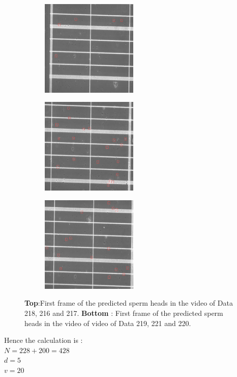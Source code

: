 \documentclass{article}
\begin{document}
\begin{figure}[H]
  \begin{subfigure}{4.6cm}
    \centering\includegraphics[width=4.6cm]{Data219_frame0_pred.jpg}
  \end{subfigure}
  \begin{subfigure}{4.6cm}
    \centering\includegraphics[width=4.6cm]{Data221_frame0_pred.jpg}
  \end{subfigure}
  \begin{subfigure}{4.6cm}
    \centering\includegraphics[width=4.6cm]{Data220_frame0_pred.jpg}
  \end{subfigure}
  \caption{ 
  \textbf{Top}:First frame of the predicted sperm heads in the video of Data 218, 216 and 217.
  \textbf{Bottom} : First frame of the predicted sperm heads in the video of video of Data 219, 221 and 220.}
  \label{fig:pred_video}
\end{figure}


Hence the calculation is : \\

$N = 228 + 200 = 428$ \\
$d = 5$ \\
$v = 20$ \\
\end{document}
